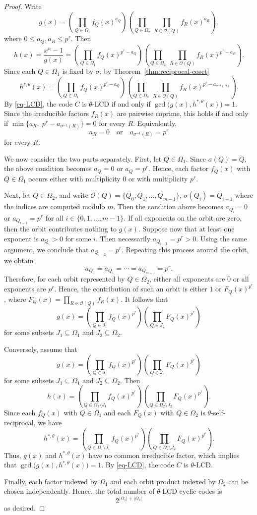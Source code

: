 \documentclass[10pt,a4paper]{amsart}
\begin{document}
\begin{proof}
Write
\[
g(x)=
\left(\prod_{Q\in \Omega_1} f_Q(x)^{a_Q}\right)
\left(\prod_{Q\in \Omega_2}\ \prod_{R\in \mathcal O(Q)} f_R(x)^{a_R}\right),
\]
where $0\le a_Q,a_R\le p^r$.
Then
\[
h(x)=\frac{x^n-1}{g(x)}
=
\left(\prod_{Q\in \Omega_1} f_Q(x)^{p^r-a_Q}\right)
\left(\prod_{Q\in \Omega_2}\ \prod_{R\in \mathcal O(Q)} f_R(x)^{p^r-a_R}\right).
\]
Since each $Q\in \Omega_1$ is fixed by $\sigma$,  by Theorem~\ref{thm:reciprocal-coset}
\[
h^{\ast,\theta}(x)=
\left(\prod_{Q\in \Omega_1} f_Q(x)^{p^r-a_Q}\right)
\left(\prod_{Q\in \Omega_2}\ \prod_{R\in \mathcal O(Q)} f_R(x)^{p^r-a_{\sigma^{-1}(R)}}\right).
\]
By \eqref{eq-LCD}, the code $C$ is $\theta$-LCD if and only if
$
\gcd\bigl(g(x),h^{\ast,\theta}(x)\bigr)=1$.
Since the irreducible factors $f_R(x)$ are pairwise coprime, this holds if and only if
$
\min\{a_R,\;p^r-a_{\sigma^{-1}(R)}\}=0$ for every $R$.
Equivalently,
\[
a_R=0
\quad\text{or}\quad
a_{\sigma^{-1}(R)}=p^r
\]
for every $R$.

We now consider the two parts separately.
First, let $Q\in \Omega_1$. Since $\sigma(Q)=Q$, the above condition becomes
$
a_Q=0 \text{ or }
a_Q=p^r$.
Hence, each factor $f_Q(x)$ with $Q\in \Omega_1$ occurs either with multiplicity $0$ or with multiplicity $p^r$.

Next, let $Q\in \Omega_2$, and write
$
\mathcal O(Q)=\{Q_0,Q_1,\dots,Q_{m-1}\}
$,  $ \sigma(Q_i)=Q_{i+1}$
 where the indices are computed modulo $m$.
Then the condition above becomes
$
a_{Q_i}=0 $ or $
a_{Q_{i-1}}=p^r$ 
 for all $i\in \{0,1,\dots, m-1\}$.
If all exponents on the orbit are zero, then the orbit contributes nothing to $g(x)$. Suppose now that at least one exponent is $
a_{Q_i}>0$
for some $i$. Then necessarily
$
a_{Q_{i-1}}=p^r>0$. Using the same argument, we conclude that $
a_{Q_{i-2}}=p^r$.
Repeating this process around the orbit, we obtain
\[
a_{Q_0}=a_{Q_1}=\cdots=a_{Q_{m-1}}=p^r.
\]
Therefore, for each orbit represented by $Q\in \Omega_2$, either all exponents are $0$ or all exponents are $p^r$. Hence, the contribution of such an orbit is either $1$ or
$
F_Q(x)^{p^r}$, where 
$F_Q(x)=\prod_{R\in \mathcal O(Q)} f_R(x)$.
It follows that
\[
g(x)=
\left(\prod_{Q\in J_1} f_Q(x)^{p^r}\right)
\left(\prod_{Q\in J_2} F_Q(x)^{p^r}\right)
\]
for some subsets $J_1\subseteq \Omega_1$ and $J_2\subseteq \Omega_2$.

Conversely, assume that
\[
g(x)=
\left(\prod_{Q\in J_1} f_Q(x)^{p^r}\right)
\left(\prod_{Q\in J_2} F_Q(x)^{p^r}\right)
\]
for some subsets $J_1\subseteq \Omega_1$ and $J_2\subseteq \Omega_2$. Then
\[
h(x)=
\left(\prod_{Q\in \Omega_1\setminus J_1} f_Q(x)^{p^r}\right)
\left(\prod_{Q\in \Omega_2\setminus J_2} F_Q(x)^{p^r}\right).
\]
Since each $f_Q(x)$ with $Q\in\Omega_1$ and each $F_Q(x)$ with $Q\in\Omega_2$ is $\theta$-self-reciprocal, we have
\[
h^{\ast,\theta}(x)=
\left(\prod_{Q\in \Omega_1\setminus J_1} f_Q(x)^{p^r}\right)
\left(\prod_{Q\in \Omega_2\setminus J_2} F_Q(x)^{p^r}\right).
\]
Thus, $g(x)$ and $h^{\ast,\theta}(x)$ have no common irreducible factor, which implies that $
\gcd\bigl(g(x),h^{\ast,\theta}(x)\bigr)=1$.
By \eqref{eq-LCD}, the code $C$ is $\theta$-LCD.

Finally, each factor indexed by $\Omega_1$ and each orbit product indexed by $\Omega_2$ can be chosen independently. Hence, the total number of $\theta$-LCD cyclic codes is
\[
2^{|\Omega_1|+|\Omega_2|}
\]as desired.
\end{proof}
\end{document}
